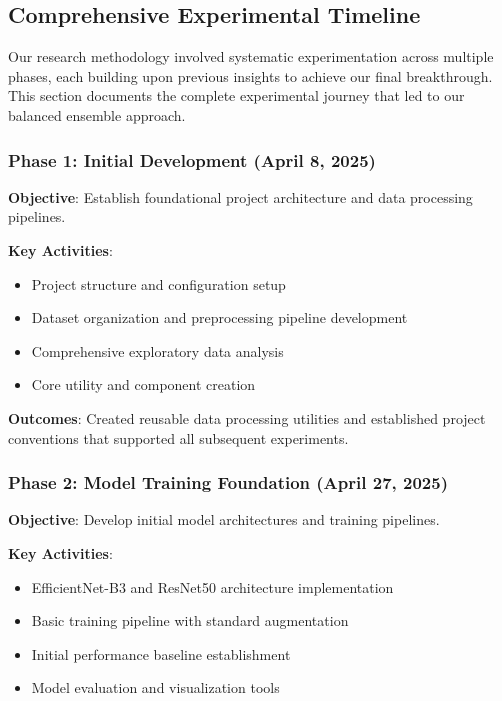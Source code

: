 \documentclass[12pt]{article}
\begin{document}
\subsection{Comprehensive Experimental Timeline}

Our research methodology involved systematic experimentation across multiple phases, each building upon previous insights to achieve our final breakthrough. This section documents the complete experimental journey that led to our balanced ensemble approach.

\subsubsection{Phase 1: Initial Development (April 8, 2025)}

\textbf{Objective}: Establish foundational project architecture and data processing pipelines.

\textbf{Key Activities}:
\begin{itemize}[itemsep=1pt,parsep=0pt,topsep=2pt]
\item Project structure and configuration setup
\item Dataset organization and preprocessing pipeline development
\item Comprehensive exploratory data analysis
\item Core utility and component creation
\end{itemize}

\textbf{Outcomes}: Created reusable data processing utilities and established project conventions that supported all subsequent experiments.

\subsubsection{Phase 2: Model Training Foundation (April 27, 2025)}

\textbf{Objective}: Develop initial model architectures and training pipelines.

\textbf{Key Activities}:
\begin{itemize}[itemsep=1pt,parsep=0pt,topsep=2pt]
\item EfficientNet-B3 and ResNet50 architecture implementation
\item Basic training pipeline with standard augmentation
\item Initial performance baseline establishment
\item Model evaluation and visualization tools
\end{itemize}
\end{document}
